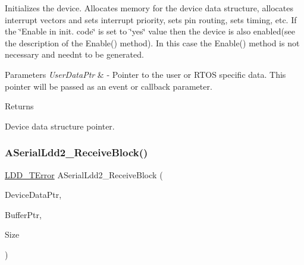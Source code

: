 Initializes the device. Allocates memory for the device data structure, allocates interrupt vectors and sets interrupt priority, sets pin routing, sets timing, etc. If the \char`\"{}\+Enable
    in init. code\char`\"{} is set to \char`\"{}yes\char`\"{} value then the device is also enabled(see the description of the Enable() method). In this case the Enable() method is not necessary and needn\textquotesingle{}t to be generated. 


\begin{DoxyParams}{Parameters}
{\em User\+Data\+Ptr} & -\/ Pointer to the user or R\+T\+OS specific data. This pointer will be passed as an event or callback parameter. \\
\hline
\end{DoxyParams}
\begin{DoxyReturn}{Returns}

\begin{DoxyItemize}
\item Device data structure pointer. 
\end{DoxyItemize}
\end{DoxyReturn}
\mbox{\label{group___a_serial_ldd2__module_gaf41a4ccffe5f5791cbc9b6e6e912962d}} 
\subsubsection{\texorpdfstring{A\+Serial\+Ldd2\+\_\+\+Receive\+Block()}{ASerialLdd2\_ReceiveBlock()}}
{\footnotesize\ttfamily \hyperlink{group___p_e___types__module_ga24c2b045fd04e79e85f261ce4df35588}{L\+D\+D\+\_\+\+T\+Error} A\+Serial\+Ldd2\+\_\+\+Receive\+Block (\begin{DoxyParamCaption}\item[{\hyperlink{group___p_e___types__module_gac5cf1362f1f0e3a2ce71b1bf2276d091}{L\+D\+D\+\_\+\+T\+Device\+Data} $\ast$}]{Device\+Data\+Ptr,  }\item[{\hyperlink{group___p_e___types__module_gade8ef9401405bd941b6da738b807f980}{L\+D\+D\+\_\+\+T\+Data} $\ast$}]{Buffer\+Ptr,  }\item[{uint16\+\_\+t}]{Size }\end{DoxyParamCaption})}



